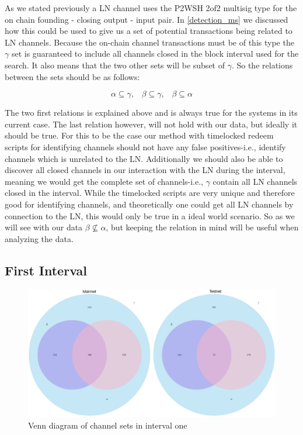 As we stated previously a LN channel uses the P2WSH 2of2 multisig type for the on chain founding - closing output - input pair. In \cref{detection_ms} we discussed how this could be used to give us a set of potential transactions being related to LN channels. Because the on-chain channel transactions must be of this type the \( \gamma \) set is guaranteed to include all channels closed in the block interval used for the search. It also means that the two other sets will be subset of \( \gamma \). So the relations between the sets should be as follows:

\begin{equation} \label{eq:1}
      \alpha \subseteq \gamma, \hspace{10pt} \beta \subseteq \gamma, \hspace{10pt} \beta \subseteq \alpha  
\end{equation}

The two first relations is explained above and is always true for the systems in its current case. The last relation however, will not hold with our data, but ideally it should be true. For this to be the case our method with timelocked redeem scripts for identifying channels should not have any false positives-i.e., identify channels which is unrelated to the LN. Additionally we should also be able to discover all closed channels in our interaction with the LN during the interval, meaning we would get the complete set of channels-i.e., \( \gamma \) contain all LN channels closed in the interval. While the timelocked scripts are very unique and therefore good for identifying channels, and theoretically one could get all LN channels by connection to the LN, this would only be true in a ideal world scenario. So as we will see with our data \( \beta \not\subseteq \alpha \), but keeping the relation in mind will be useful when analyzing the data.

\subsection{First Interval}

\begin{figure}[ht]
    \centering
    \includegraphics[width=16cm]{figures/graphs/venn_full.png}
    \caption{Venn diagram of channel sets in interval one}
    \label{fig:venn_run1}
\end{figure}

